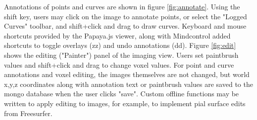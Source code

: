 Annotations of points and curves are shown in figure \ref{fig:annotate}. Using the shift key, users may click on the image to annotate points, or select the "Logged Curves" toolbar, and shift+click and drag to draw curves. Keyboard and mouse shortcuts provided by the Papaya.js viewer, along with Mindcontrol added shortcuts to toggle overlays (zz) and undo annotations (dd). Figure \ref{fig:edit} shows the editing ("Painter") panel of the imaging view. Users set paintbrush values and  shift+click and drag to change voxel values. For point and curve annotations and voxel editing, the images themselves are not changed, but world x,y,z coordinates along with annotation text or paintbrush values are saved to the mongo database when the user clicks "save". Custom offline functions may be written to apply editing to images, for example, to implement pial surface edits from Freesurfer. 